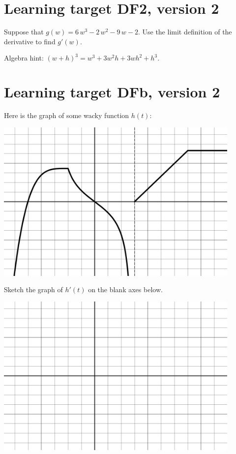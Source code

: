 \section{Learning target DF2, version 2}

Suppose that  \(g(w) = 6 \, w^{3} - 2 \, w^{2} - 9 \, w - 2\). Use the limit definition of the derivative to find $g'(w)$.

\vspace{1em} 

Algebra hint: $(w+h)^3 = w^3 + 3w^2 h + 3w h^2 + h^3$.

\pagebreak

\section{Learning target DFb, version 2}

Here is the graph of some wacky function $h(t)$:

\begin{center}
    \includegraphics[width=0.9\textwidth]{../images/DFb-v2.png}    
\end{center}


Sketch the graph of $h'(t)$ on the blank axes below.

\begin{center}
    \includegraphics[width=0.9\textwidth]{../images/DFb-v2-blank.png}    
\end{center}

